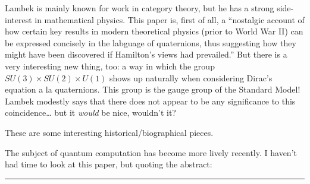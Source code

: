 \documentclass{article}
\def\tightlist{}
\renewcommand{\texttt}[1]{%
  \begingroup
  \ttfamily
  \begingroup\lccode`~=`/\lowercase{\endgroup\def~}{/\discretionary{}{}{}}%
  \begingroup\lccode`~=`[\lowercase{\endgroup\def~}{[\discretionary{}{}{}}%
  \begingroup\lccode`~=`.\lowercase{\endgroup\def~}{.\discretionary{}{}{}}%
  \catcode`/=\active\catcode`[=\active\catcode`.=\active
  \scantokens{#1\noexpand}%
  \endgroup
}
\begin{document}
Lambek is mainly known for work in category theory, but he has a strong
side-interest in mathematical physics. This paper is, first of all, a
``nostalgic account of how certain key results in modern theoretical
physics (prior to World War II) can be expressed concisely in the
labguage of quaternions, thus suggesting how they might have been
discovered if Hamilton's views had prevailed.'' But there is a very
interesting new thing, too: a way in which the group
\(SU(3) \times SU(2) \times U(1)\) shows up naturally when considering
Dirac's equation a la quaternions. This group is the gauge group of the
Standard Model! Lambek modestly says that there does not appear to be
any significance to this coincidence\ldots{} but it \emph{would} be
nice, wouldn't it?


These are some interesting historical/biographical pieces.


The subject of quantum computation has become more lively recently. I
haven't had time to look at this paper, but quoting the abstract:

\begin{center}\rule{0.5\linewidth}{0.5pt}\end{center}
\end{document}

